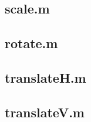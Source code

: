 \subsection{scale.m}


\subsection{rotate.m}


\subsection{translateH.m}


\subsection{translateV.m}


